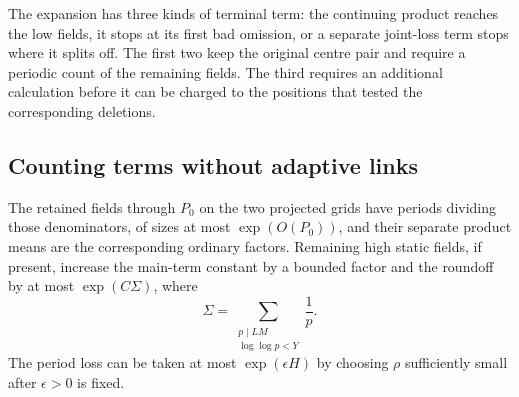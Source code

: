 The expansion has three kinds of terminal term: the continuing product
reaches the low fields, it stops at its first bad omission, or a separate
joint-loss term stops where it splits off. The first two keep the
original centre pair and require a periodic count of the remaining
fields. The third requires an additional calculation before it can be
charged to the positions that tested the corresponding deletions.

\subsection{Counting terms without adaptive links}

\begin{lemma}\label{join:endpoint-count}
The retained fields through $P_0$ on the two projected grids have
periods dividing those denominators, of sizes at most
$\exp(O(P_0))$, and their separate product means are the corresponding
ordinary factors. Remaining high static fields, if present, increase
the main-term constant by a bounded factor and the roundoff by at most
$\exp(C\Sigma)$, where
\[
 \Sigma=\sum_{\substack{p\mid LM\\ \log\log p<Y}}\frac1p.
\]
The period loss can be taken at most $\exp(\epsilon H)$ by choosing
$\rho$ sufficiently small after $\epsilon>0$ is fixed.
\end{lemma}

